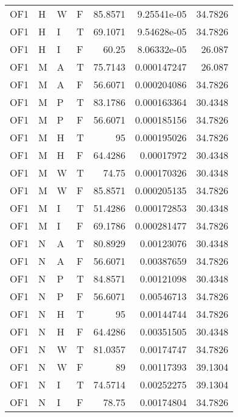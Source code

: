 \begin{table}[htb!]
{\begin{tabular}{llllrrr}
            OF1      & H     & W     & F          & 85.8571    & 9.25541e-05 & 34.7826  \\
            OF1      & H     & I     & T          & 69.1071    & 9.54628e-05 & 34.7826  \\
            OF1      & H     & I     & F          & 60.25      & 8.06332e-05 & 26.087   \\
            OF1      & M     & A     & T          & 75.7143    & 0.000147247 & 26.087   \\
            OF1      & M     & A     & F          & 56.6071    & 0.000204086 & 34.7826  \\
            OF1      & M     & P     & T          & 83.1786    & 0.000163364 & 30.4348  \\
            OF1      & M     & P     & F          & 56.6071    & 0.000185156 & 34.7826  \\
            OF1      & M     & H     & T          & 95         & 0.000195026 & 34.7826  \\
            OF1      & M     & H     & F          & 64.4286    & 0.00017972  & 30.4348  \\
            OF1      & M     & W     & T          & 74.75      & 0.000170326 & 30.4348  \\
            OF1      & M     & W     & F          & 85.8571    & 0.000205135 & 34.7826  \\
            OF1      & M     & I     & T          & 51.4286    & 0.000172853 & 30.4348  \\
            OF1      & M     & I     & F          & 69.1786    & 0.000281477 & 34.7826  \\
            OF1      & N     & A     & T          & 80.8929    & 0.00123076  & 30.4348  \\
            OF1      & N     & A     & F          & 56.6071    & 0.00387659  & 34.7826  \\
            OF1      & N     & P     & T          & 84.8571    & 0.00121098  & 30.4348  \\
            OF1      & N     & P     & F          & 56.6071    & 0.00546713  & 34.7826  \\
            OF1      & N     & H     & T          & 95         & 0.00144744  & 34.7826  \\
            OF1      & N     & H     & F          & 64.4286    & 0.00351505  & 30.4348  \\
            OF1      & N     & W     & T          & 81.0357    & 0.00174747  & 34.7826  \\
            OF1      & N     & W     & F          & 89         & 0.00117393  & 39.1304  \\
            OF1      & N     & I     & T          & 74.5714    & 0.00252275  & 39.1304  \\
            OF1      & N     & I     & F          & 78.75      & 0.00174804  & 34.7826  \\
            \hline
        \end{tabular}
    }{
    }
\end{table} 
